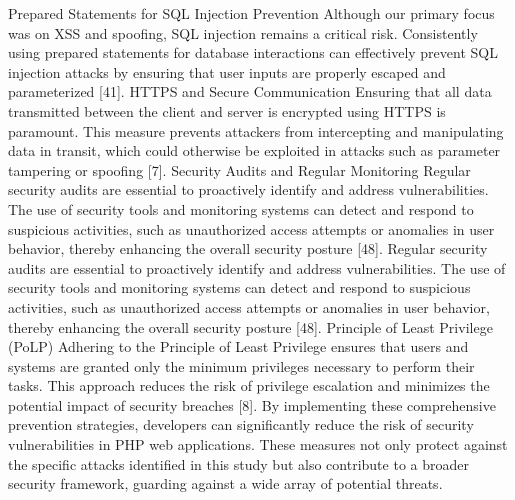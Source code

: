 \documentclass[letterpaper,twocolumn]{article}
\begin{document}
Prepared Statements for SQL Injection Prevention
Although our primary focus was on XSS and spoofing, SQL injection remains a critical risk. Consistently using prepared statements for database interactions can effectively prevent SQL injection attacks by ensuring that user inputs are properly escaped and parameterized [41].
HTTPS and Secure Communication
Ensuring that all data transmitted between the client and server is encrypted using HTTPS is paramount. This measure prevents attackers from intercepting and manipulating data in transit, which could otherwise be exploited in attacks such as parameter tampering or spoofing [7].
Security Audits and Regular Monitoring
Regular security audits are essential to proactively identify and address vulnerabilities. The use of security tools and monitoring systems can detect and respond to suspicious activities, such as unauthorized access attempts or anomalies in user behavior, thereby enhancing the overall security posture [48]. Regular security audits are essential to proactively identify and address vulnerabilities. The use of security tools and monitoring systems can detect and respond to suspicious activities, such as unauthorized access attempts or anomalies in user behavior, thereby enhancing the overall security posture [48].
Principle of Least Privilege (PoLP)
Adhering to the Principle of Least Privilege ensures that users and systems are granted only the minimum privileges necessary to perform their tasks. This approach reduces the risk of privilege escalation and minimizes the potential impact of security breaches [8].
By implementing these comprehensive prevention strategies, developers can significantly reduce the risk of security vulnerabilities in PHP web applications. These measures not only protect against the specific attacks identified in this study but also contribute to a broader security framework, guarding against a wide array of potential threats.
\end{document}
